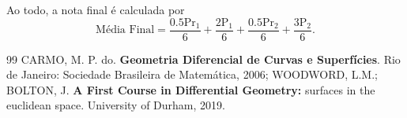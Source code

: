 \documentclass[12pt]{article}
\begin{document}
Ao todo, a nota final é calculada por
\[
	\text{Média Final} =  \frac{0.5\mathrm{Pr}_{1}}{6} + \frac{2 \mathrm{P}_{1}}{6} +\frac{0.5\mathrm{Pr}_{2}}{6}+\frac{3 \mathrm{P}_{2}}{6}.
\]
\newpage


\newpage

\newpage

\newpage

\newpage

\newpage

\newpage

\newpage

\newpage

\newpage

\newpage

\newpage

\newpage

\newpage

\newpage

\newpage

\newpage

\newpage

\newpage

\newpage

\newpage

\newpage

\newpage

\newpage

\begin{thebibliography}{99}
	 CARMO, M. P. do. \textbf{Geometria Diferencial de Curvas e Superfícies}. Rio de Janeiro: Sociedade Brasileira de Matemática, 2006;
	 WOODWORD, L.M.; BOLTON, J. \textbf{A First Course in Differential Geometry:} surfaces in the euclidean space. University of Durham, 2019.
\end{thebibliography}
\end{document}
